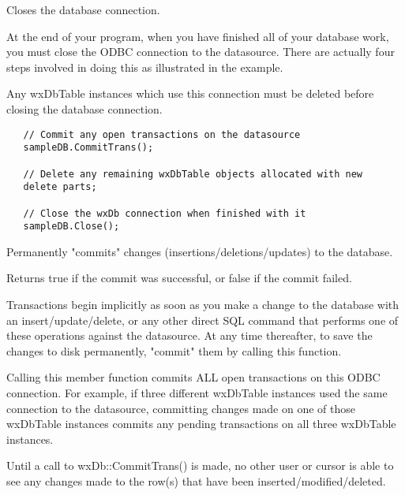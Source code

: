 \label{wxdbclose}


Closes the database connection.


At the end of your program, when you have finished all of your database work,
you must close the ODBC connection to the datasource.  There are actually
four steps involved in doing this as illustrated in the example.

Any wxDbTable instances which use this connection must be deleted before
closing the database connection.


\begin{verbatim}
   // Commit any open transactions on the datasource
   sampleDB.CommitTrans();

   // Delete any remaining wxDbTable objects allocated with new
   delete parts;

   // Close the wxDb connection when finished with it
   sampleDB.Close();
\end{verbatim}


\label{wxdbcommittrans}


Permanently "commits" changes (insertions/deletions/updates) to the database.


Returns true if the commit was successful, or false if the commit failed.


Transactions begin implicitly as soon as you make a change to the database
with an insert/update/delete, or any other direct SQL command that performs
one of these operations against the datasource.
At any time thereafter, to save the changes to disk permanently, "commit"
them by calling this function.

Calling this member function commits ALL open transactions on this ODBC
connection.  For example, if three different wxDbTable instances used the
same connection to the datasource, committing changes made on one of those
wxDbTable instances commits any pending transactions on all three wxDbTable
instances.

Until a call to wxDb::CommitTrans() is made, no other user or cursor is able
to see any changes made to the row(s) that have been inserted/modified/deleted.



